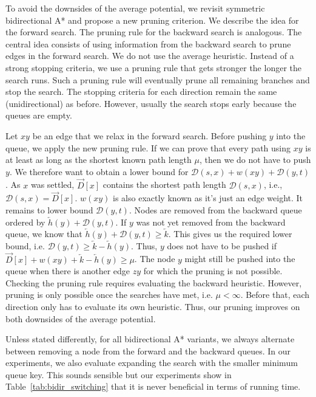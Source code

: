 \documentclass[manuscript,review]{acmart}
\newcommand*{\dist}{\mathcal{D}}
\begin{document}
To avoid the downsides of the average potential, we revisit symmetric bidirectional A* and propose a new pruning criterion.
We describe the idea for the forward search.
The pruning rule for the backward search is analogous.
The central idea consists of using information from the backward search to prune edges in the forward search.
We do not use the average heuristic.
Instead of a strong stopping criteria, we use a pruning rule that gets stronger the longer the search runs.
Such a pruning rule will eventually prune all remaining branches and stop the search.
The stopping criteria for each direction remain the same (unidirectional) as before.
However, usually the search stops early because the queues are empty.

Let $xy$ be an edge that we relax in the forward search.
Before pushing $y$ into the queue, we apply the new pruning rule.
If we can prove that every path using $xy$ is at least as long as the shortest known path length $\mu$, then we do not have to push $y$.
We therefore want to obtain a lower bound for $\dist(s,x)+w(xy)+\dist(y,t)$.
As $x$ was settled, $\overrightarrow{D}[x]$ contains the shortest path length $\dist(s,x)$, i.e., $\dist(s,x)=\overrightarrow{D}[x]$.
$w(xy)$ is also exactly known as it's just an edge weight.
It remains to lower bound $\dist(y,t)$.
Nodes are removed from the backward queue ordered by $\overleftarrow{h}(y) + \dist(y,t)$.
If $y$ was not yet removed from the backward queue, we know that $\overleftarrow{h}(y) + \dist(y,t) \geq \overleftarrow{k}$.
This gives us the required lower bound, i.e. $\dist(y,t) \geq \overleftarrow{k}-\overleftarrow{h}(y)$.
Thus, $y$ does not have to be pushed if $\overrightarrow{D}[x]+w(xy)+\overleftarrow{k}-\overleftarrow{h}(y)\ge \mu$.
The node $y$ might still be pushed into the queue when there is another edge $zy$ for which the pruning is not possible.
Checking the pruning rule requires evaluating the backward heuristic.
However, pruning is only possible once the searches have met, i.e. $\mu < \infty$.
Before that, each direction only has to evaluate its own heuristic.
Thus, our pruning improves on both downsides of the average potential.

Unless stated differently, for all bidirectional A* variants, we always alternate between removing a node from the forward and the backward queues.
In our experiments, we also evaluate expanding the search with the smaller minimum queue key.
This sounds sensible but our experiments show in Table~\ref{tab:bidir_switching} that it is never beneficial in terms of running time.
\end{document}
